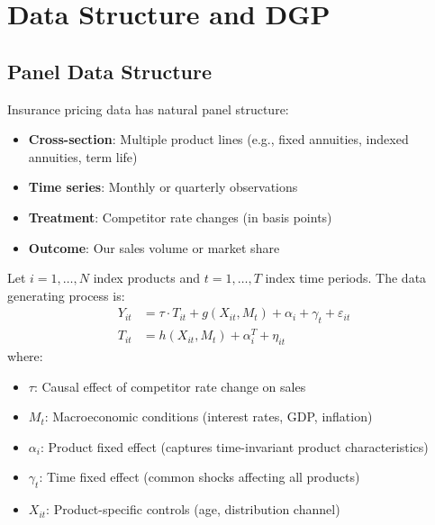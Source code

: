 \section{Data Structure and DGP}\label{sec:data_structure}

\subsection{Panel Data Structure}

Insurance pricing data has natural panel structure:
\begin{itemize}
    \item \textbf{Cross-section}: Multiple product lines (e.g., fixed annuities, indexed annuities, term life)
    \item \textbf{Time series}: Monthly or quarterly observations
    \item \textbf{Treatment}: Competitor rate changes (in basis points)
    \item \textbf{Outcome}: Our sales volume or market share
\end{itemize}

\begin{definition}
\label{def:insurance_panel}
Let $i = 1, \ldots, N$ index products and $t = 1, \ldots, T$ index time periods. The data generating process is:
\begin{align}
Y_{it} &= \tau \cdot T_{it} + g(X_{it}, M_t) + \alpha_i + \gamma_t + \varepsilon_{it} \label{eq:insurance_dgp} \\
T_{it} &= h(X_{it}, M_t) + \alpha_i^T + \eta_{it}
\end{align}
where:
\begin{itemize}
    \item $\tau$: Causal effect of competitor rate change on sales
    \item $M_t$: Macroeconomic conditions (interest rates, GDP, inflation)
    \item $\alpha_i$: Product fixed effect (captures time-invariant product characteristics)
    \item $\gamma_t$: Time fixed effect (common shocks affecting all products)
    \item $X_{it}$: Product-specific controls (age, distribution channel)
\end{itemize}
\end{definition}

